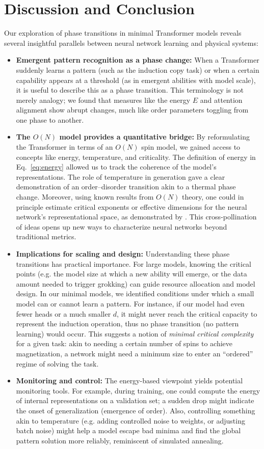 \documentclass[12pt]{article}
\begin{document}
\section{Discussion and Conclusion}
Our exploration of phase transitions in minimal Transformer models reveals several insightful parallels between neural network learning and physical systems:
\begin{itemize}
    \item \textbf{Emergent pattern recognition as a phase change:} When a Transformer suddenly learns a pattern (such as the induction copy task) or when a certain capability appears at a threshold (as in emergent abilities with model scale), it is useful to describe this as a phase transition. This terminology is not merely analogy; we found that measures like the energy $E$ and attention alignment show abrupt changes, much like order parameters toggling from one phase to another.
    \item \textbf{The $O(N)$ model provides a quantitative bridge:} By reformulating the Transformer in terms of an $O(N)$ spin model, we gained access to concepts like energy, temperature, and criticality. The definition of energy in Eq.~\ref{eq:energy} allowed us to track the coherence of the model’s representations. The role of temperature in generation gave a clear demonstration of an order–disorder transition akin to a thermal phase change. Moreover, using known results from $O(N)$ theory, one could in principle estimate critical exponents or effective dimensions for the neural network's representational space, as demonstrated by \citet{sun2025}. This cross-pollination of ideas opens up new ways to characterize neural networks beyond traditional metrics.
    \item \textbf{Implications for scaling and design:} Understanding these phase transitions has practical importance. For large models, knowing the critical points (e.g. the model size at which a new ability will emerge, or the data amount needed to trigger grokking) can guide resource allocation and model design. In our minimal models, we identified conditions under which a small model can or cannot learn a pattern. For instance, if our model had even fewer heads or a much smaller $d$, it might never reach the critical capacity to represent the induction operation, thus no phase transition (no pattern learning) would occur. This suggests a notion of \emph{minimal critical complexity} for a given task: akin to needing a certain number of spins to achieve magnetization, a network might need a minimum size to enter an ``ordered'' regime of solving the task.
    \item \textbf{Monitoring and control:} The energy-based viewpoint yields potential monitoring tools. For example, during training, one could compute the energy of internal representations on a validation set; a sudden drop might indicate the onset of generalization (emergence of order). Also, controlling something akin to temperature (e.g. adding controlled noise to weights, or adjusting batch noise) might help a model escape bad minima and find the global pattern solution more reliably, reminiscent of simulated annealing.
\end{itemize}
\end{document}
